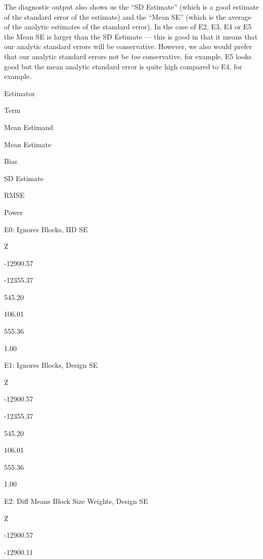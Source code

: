 \documentclass[
  12pt,
]{book}
\newenvironment{Shaded}{\begin{snugshade}}{\end{snugshade}}
\newcommand{\CommentTok}[1]{\textcolor[rgb]{0.56,0.35,0.01}{\textit{#1}}}
\newcommand{\KeywordTok}[1]{\textcolor[rgb]{0.13,0.29,0.53}{\textbf{#1}}}
\newcommand{\NormalTok}[1]{#1}
\theoremstyle{definition}
\theoremstyle{definition}
\theoremstyle{definition}
\theoremstyle{remark}
\begin{document}
The diagnostic output also shows us the ``SD Estimate'' (which is a good
estimate of the standard error of the estimate) and the ``Mean SE''
(which is the average of the analytic estimates of the standard error).
In the case of E2, E3, E4 or E5 the Mean SE is larger than the SD
Estimate --- this is good in that it means that our analytic standard
errors will be conservative. However, we also would prefer that our
analytic standard errors not be \emph{too} conservative, for example, E5
looks good but the mean analytic standard error is quite high compared
to E4, for example.

\begin{Shaded}
\end{Shaded}

Estimator

Term

Mean Estimand

Mean Estimate

Bias

SD Estimate

RMSE

Power

E0: Ignores Blocks, IID SE

Z

-12900.57

-12355.37

545.20

106.01

555.36

1.00

E1: Ignores Blocks, Design SE

Z

-12900.57

-12355.37

545.20

106.01

555.36

1.00

E2: Diff Means Block Size Weights, Design SE

Z

-12900.57

-12900.11
\end{document}
